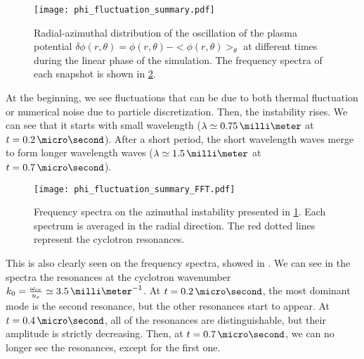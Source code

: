     
    \begin{figure}[!hbt]
      \centering
      \texttt{[image: phi\_fluctuation\_summary.pdf]}
      \caption{Radial-azimuthal distribution of the oscillation of the plasma potential $\delta \phi(r, \theta) = \phi(r, \theta) - < \phi(r, \theta) >_{ \theta}$ at different times during the linear phase of the simulation. The frequency spectra of each snapshot is shown in \cref{fig-phi_fluctuation_summary_FFT}. }
      \label{fig-phi_fluctuation_summary}
    \end{figure}
    
    At the beginning, we see fluctuations that can be due to both thermal fluctuation \citep{salpeter1960} or numerical noise due to particle discretization.
    Then, the instability rises.
    We can see that it starts with small wavelength ($\lambda \simeq 0.75\,\milli\meter$ at $t=0.2\,\micro\second$).
    After a short period, the short wavelength waves merge to form longer wavelength waves  ($\lambda \simeq 1.5\,\milli\meter$ at $t=0.7\,\micro\second$).
    
    
    \begin{figure}[!hbt]
      \centering
      \texttt{[image: phi\_fluctuation\_summary\_FFT.pdf]}
      \caption{Frequency spectra on the azimuthal instability presented in \cref{fig-phi_fluctuation_summary}. Each spectrum is averaged in the radial direction. The red dotted lines represent the cyclotron resonances.}
      \label{fig-phi_fluctuation_summary_FFT}
    \end{figure}
    
    This is also clearly seen on the frequency spectra, showed in .
    We can see in the spectra the resonances at the cyclotron wavenumber $k_0 = \frac{\oce}{u_e} \simeq 3.5\,\milli\meter^{-1}$.
    At $t=0.2\,\micro\second$, the most dominant mode is the second resonance, but the other resonances start to appear.
    At $t=0.4\,\micro\second$, all of the resonances are distinguishable, but their amplitude is strictly decreasing.
    Then, at $t=0.7\,\micro\second$, we can no longer see the resonances, except for the first one.
    
